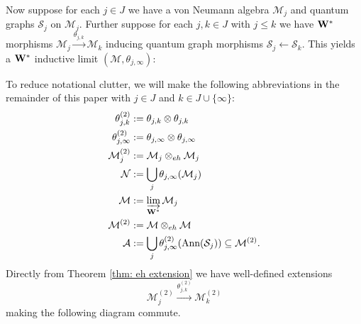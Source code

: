 \documentclass[12pt]{article}
\theoremstyle{definition}
\newcommand{\mc}[1]{\mathcal{#1}}
\newcommand{\<}{\langle}
\renewcommand{\>}{\rangle}
\newcommand{\Ann}{\text{Ann}}
\begin{document}
Now suppose for each $j \in J$ we have a von Neumann algebra $\mc M_j$ and quantum graphs $\mc S_j$ on $\mc M_j$. Further suppose for each $j,k \in J$ with $j \leq k$ we have ${\bf{W^*}}$ morphisms $\mc M_j \overset{\theta_{j,k}} {\to} \mc M_k$ inducing quantum graph morphisms $\mc S_j \leftarrow \mc S_k$. This yields a $\bf{W^*}$ inductive limit $(\mc M, \theta_{j,\infty})$:
\begin{center}
\end{center}
To reduce notational clutter, we will make the following abbreviations in the remainder of this paper with $j \in J$ and $k \in J \cup\{\infty\}$: 
\begin{align*}
    \theta_{j,k}^{(2)} &:= \theta_{j,k} \otimes \theta_{j,k}\\
    \theta_{j, \infty}^{(2)} &:= \theta_{j,\infty} \otimes \theta_{j,\infty}\\
    \mc M_j^{(2)} &:= \mc M_j \otimes_{eh} \mc M_j \\
    \mc N &:= \bigcup_j \theta_{j,\infty}(\mc M_j) \\
    \mc M &:= \varinjlim_{\bf W^*} \mc M_j \\
    \mc M^{(2)} &:= \mc M \otimes_{eh} \mc M \\
    \mc A &:= \bigcup_j \theta_{j,\infty}^{(2)}(\Ann(\mc S_j)) \subseteq \mc M^{(2)}.
\end{align*}
Directly from Theorem \ref{thm: eh extension} we have well-defined extensions
\[
\mc M_j^{(2)} \overset{\theta_{j,k}^{(2)} }{\longrightarrow} \mc M_k^{(2)} 
\]
making the following diagram commute.
\begin{center}
\end{center}
\end{document}
